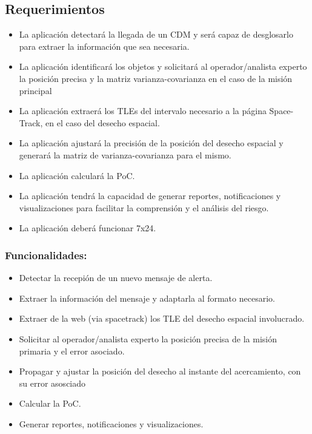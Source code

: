 \subsection*{Requerimientos}
\begin{itemize}
\item La aplicaci\'on detectar\'a la llegada de un CDM y ser\'a capaz de desglosarlo para extraer la informaci\'on que sea necesaria.\\
\item La aplicaci\'on identificar\'a los objetos y solicitar\'a al operador/analista experto la posici\'on precisa y la matriz varianza-covarianza en el caso de la misi\'on principal\\
\item La aplicaci\'on extraer\'a los TLEs del intervalo necesario a la p\'agina Space-Track, en el caso del desecho espacial.\\
\item La aplicaci\'on ajustar\'a la precisi\'on de la posici\'on del desecho espacial y generar\'a la matriz de varianza-covarianza para el mismo.\\
\item La aplicaci\'on calcular\'a la PoC.\\
\item La aplicaci\'on tendr\'a la capacidad de generar reportes, notificaciones y visualizaciones para facilitar la comprensi\'on y el an\'alisis del riesgo.
\item La aplicaci\'on deber\'a funcionar 7x24.
\end{itemize}

\subsubsection*{Funcionalidades:}
\begin{itemize}
\item Detectar la recepi\'on de un nuevo mensaje de alerta.\\
\item Extraer la informaci\'on del mensaje y adaptarla al formato necesario.\\
\item Extraer de la web (via spacetrack) los TLE del desecho espacial involucrado.\\
\item Solicitar al operador/analista experto la posici\'on precisa de la misi\'on primaria y el error asociado.\\
\item Propagar y ajustar la posici\'on del desecho al instante del acercamiento, con su error asosciado\\
\item Calcular la PoC.\\
\item Generar reportes, notificaciones y visualizaciones.\\
\end{itemize}


